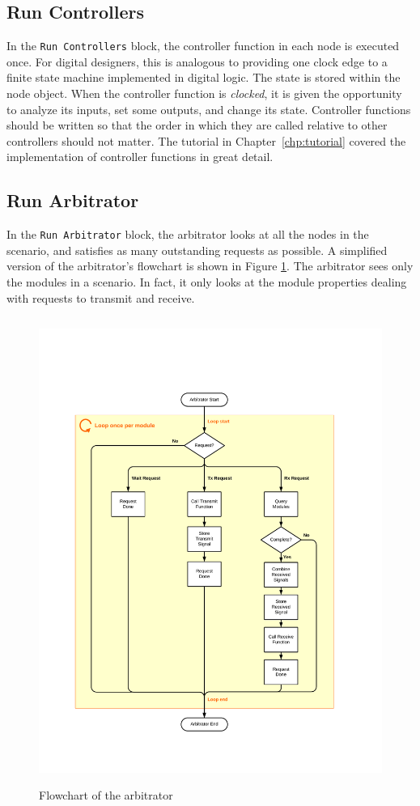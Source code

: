 \subsection{Run Controllers}

In the \verb+Run Controllers+ block, the controller function in each
node is executed once.  For digital designers, this is analogous to
providing one clock edge to a finite state machine implemented in
digital logic.  The state is stored within the node object.  When
the controller function is \emph{clocked}, it is given the
opportunity to analyze its inputs, set some outputs, and change its
state. Controller functions should be written so that the order in
which they are called relative to other controllers should not
matter. The tutorial in Chapter~\ref{chp:tutorial} covered the
implementation of controller functions in great detail.

\subsection{Run Arbitrator} \label{sec:runArbitrator}

In the \verb+Run Arbitrator+ block, the arbitrator looks at all the
nodes in the scenario, and satisfies as many outstanding requests as
possible.  A simplified version of the arbitrator's flowchart is
shown in Figure \ref{fig:arbitFlowchart}.  The arbitrator sees only
the modules in a scenario.  In fact, it only looks at the module
properties dealing with requests to transmit and receive.

\begin{figure}[!h]
\centering
\includegraphics[height=6in]{"figs/Arbitrator Flowchart"}
\caption{Flowchart of the arbitrator}
\label{fig:arbitFlowchart}
\end{figure}

